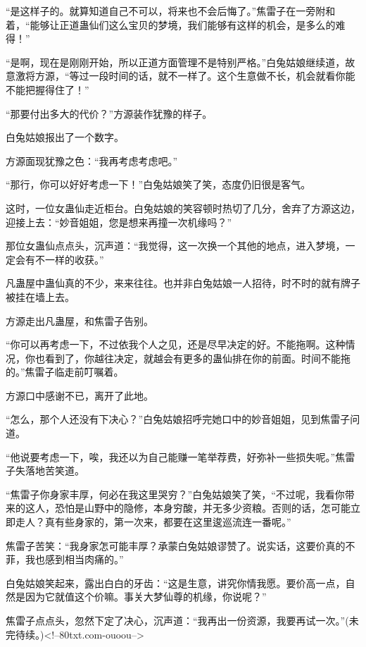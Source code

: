 \begin{this_body}
“是这样子的。就算知道自己不可以，将来也不会后悔了。”焦雷子在一旁附和着，“能够让正道蛊仙们这么宝贝的梦境，我们能够有这样的机会，是多么的难得！”

“是啊，现在是刚刚开始，所以正道方面管理不是特别严格。”白兔姑娘继续道，故意激将方源，“等过一段时间的话，就不一样了。这个生意做不长，机会就看你能不能把握得住了！”

“那要付出多大的代价？”方源装作犹豫的样子。

白兔姑娘报出了一个数字。

方源面现犹豫之色：“我再考虑考虑吧。”

“那行，你可以好好考虑一下！”白兔姑娘笑了笑，态度仍旧很是客气。

这时，一位女蛊仙走近柜台。白兔姑娘的笑容顿时热切了几分，舍弃了方源这边，迎接上去：“妙音姐姐，您是想来再撞一次机缘吗？”

那位女蛊仙点点头，沉声道：“我觉得，这一次换一个其他的地点，进入梦境，一定会有不一样的收获。”

凡蛊屋中蛊仙真的不少，来来往往。也并非白兔姑娘一人招待，时不时的就有牌子被挂在墙上去。

方源走出凡蛊屋，和焦雷子告别。

“你可以再考虑一下，不过依我个人之见，还是尽早决定的好。不能拖啊。这种情况，你也看到了，你越往决定，就越会有更多的蛊仙排在你的前面。时间不能拖的。”焦雷子临走前叮嘱着。

方源口中感谢不已，离开了此地。

“怎么，那个人还没有下决心？”白兔姑娘招呼完她口中的妙音姐姐，见到焦雷子问道。

“他说要考虑一下，唉，我还以为自己能赚一笔举荐费，好弥补一些损失呢。”焦雷子失落地苦笑道。

“焦雷子你身家丰厚，何必在我这里哭穷？”白兔姑娘笑了笑，“不过呢，我看你带来的这人，恐怕是山野中的隐修，本身穷酸，并无多少资粮。否则的话，怎可能立即走人？真有些身家的，第一次来，都要在这里逡巡流连一番呢。”

焦雷子苦笑：“我身家怎可能丰厚？承蒙白兔姑娘谬赞了。说实话，这要价真的不菲，我也感到相当肉痛的。”

白兔姑娘笑起来，露出白白的牙齿：“这是生意，讲究你情我愿。要价高一点，自然是因为它就值这个价嘛。事关大梦仙尊的机缘，你说呢？”

焦雷子点点头，忽然下定了决心，沉声道：“我再出一份资源，我要再试一次。”(未完待续。)<!--80txt.com-ouoou-->

\end{this_body}

